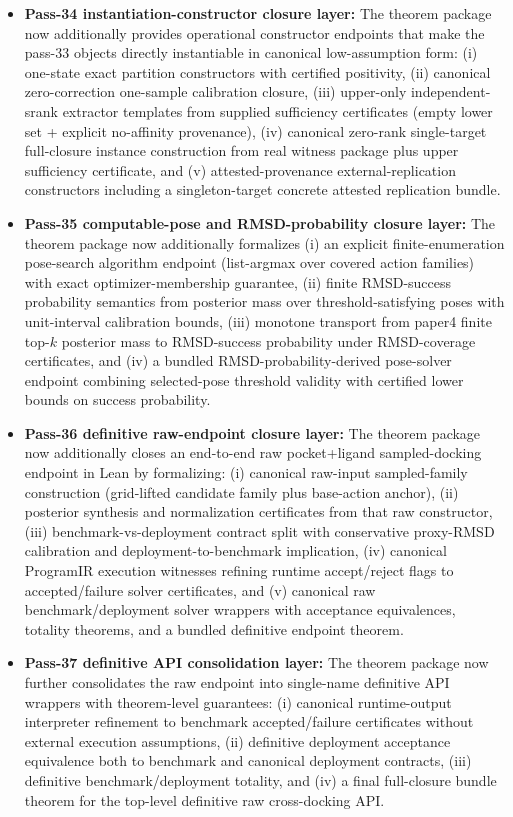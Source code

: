 \begin{itemize}
\item \textbf{Pass-34 instantiation-constructor closure layer:} The theorem package now additionally provides operational constructor endpoints that make the pass-33 objects directly instantiable in canonical low-assumption form: (i) one-state exact partition constructors with certified positivity, (ii) canonical zero-correction one-sample calibration closure, (iii) upper-only independent-srank extractor templates from supplied sufficiency certificates (empty lower set + explicit no-affinity provenance), (iv) canonical zero-rank single-target full-closure instance construction from real witness package plus upper sufficiency certificate, and (v) attested-provenance external-replication constructors including a singleton-target concrete attested replication bundle.
\item \textbf{Pass-35 computable-pose and RMSD-probability closure layer:} The theorem package now additionally formalizes (i) an explicit finite-enumeration pose-search algorithm endpoint (list-argmax over covered action families) with exact optimizer-membership guarantee, (ii) finite RMSD-success probability semantics from posterior mass over threshold-satisfying poses with unit-interval calibration bounds, (iii) monotone transport from paper4 finite top-$k$ posterior mass to RMSD-success probability under RMSD-coverage certificates, and (iv) a bundled RMSD-probability-derived pose-solver endpoint combining selected-pose threshold validity with certified lower bounds on success probability.
\item \textbf{Pass-36 definitive raw-endpoint closure layer:} The theorem package now additionally closes an end-to-end raw pocket+ligand sampled-docking endpoint in Lean by formalizing: (i) canonical raw-input sampled-family construction (grid-lifted candidate family plus base-action anchor), (ii) posterior synthesis and normalization certificates from that raw constructor, (iii) benchmark-vs-deployment contract split with conservative proxy-RMSD calibration and deployment-to-benchmark implication, (iv) canonical ProgramIR execution witnesses refining runtime accept/reject flags to accepted/failure solver certificates, and (v) canonical raw benchmark/deployment solver wrappers with acceptance equivalences, totality theorems, and a bundled definitive endpoint theorem.
\item \textbf{Pass-37 definitive API consolidation layer:} The theorem package now further consolidates the raw endpoint into single-name definitive API wrappers with theorem-level guarantees: (i) canonical runtime-output interpreter refinement to benchmark accepted/failure certificates without external execution assumptions, (ii) definitive deployment acceptance equivalence both to benchmark and canonical deployment contracts, (iii) definitive benchmark/deployment totality, and (iv) a final full-closure bundle theorem for the top-level definitive raw cross-docking API.

\end{itemize}
